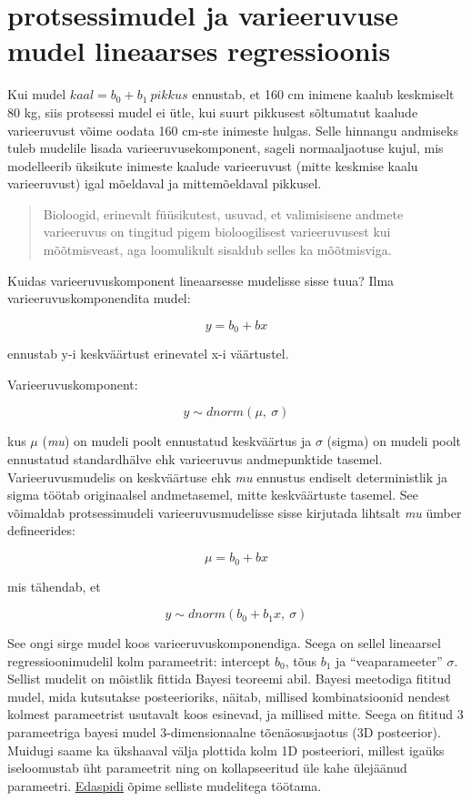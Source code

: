 \documentclass[]{book}
\begin{document}
\hypertarget{protsessimudel-ja-varieeruvuse-mudel-lineaarses-regressioonis}{%
\section{protsessimudel ja varieeruvuse mudel lineaarses regressioonis}\label{protsessimudel-ja-varieeruvuse-mudel-lineaarses-regressioonis}}

Kui mudel \(kaal = b_0 + b_1 ~pikkus\) ennustab, et 160 cm inimene kaalub keskmiselt 80 kg, siis protsessi mudel ei ütle, kui suurt pikkusest sõltumatut kaalude varieeruvust võime oodata 160 cm-ste inimeste hulgas.
Selle hinnangu andmiseks tuleb mudelile lisada varieeruvusekomponent, sageli normaaljaotuse kujul, mis modelleerib üksikute inimeste kaalude varieeruvust (mitte keskmise kaalu varieeruvust) igal mõeldaval ja mittemõeldaval pikkusel.

\begin{quote}
Bioloogid, erinevalt füüsikutest, usuvad, et valimisisene andmete
varieeruvus on tingitud pigem bioloogilisest varieeruvusest kui mõõtmisveast,
aga loomulikult sisaldub selles ka mõõtmisviga.
\end{quote}

Kuidas varieeruvuskomponent lineaarsesse mudelisse sisse tuua?
Ilma varieeruvuskomponendita mudel:

\[y = b_0 + bx\]

ennustab y-i keskväärtust erinevatel x-i väärtustel.

Varieeruvuskomponent:

\[y\sim dnorm(\mu,~\sigma)\]

kus \(\mu\) (\emph{mu}) on mudeli poolt ennustatud keskväärtus ja \(\sigma\) (sigma) on mudeli poolt ennustatud standardhälve ehk varieeruvus andmepunktide tasemel.
Varieeruvusmudelis on keskväärtuse ehk \emph{mu} ennustus endiselt deterministlik ja sigma töötab originaalsel andmetasemel, mitte keskväärtuste tasemel.
See võimaldab protsessimudeli varieeruvusmudelisse sisse kirjutada lihtsalt \emph{mu} ümber defineerides:

\[\mu = b_0 + bx\]

mis tähendab, et

\[y \sim dnorm(b_0 + b_1x, ~\sigma)\]

See ongi sirge mudel koos varieeruvuskomponendiga. Seega on sellel lineaarsel regressioonimudelil kolm parameetrit: intercept \(b_0\), tõus \(b_1\) ja ``veaparameeter'' \(\sigma\).
Sellist mudelit on mõistlik fittida Bayesi teoreemi abil.
Bayesi meetodiga fititud mudel, mida kutsutakse posteerioriks, näitab, millised kombinatsioonid nendest kolmest parameetrist usutavalt koos esinevad, ja millised mitte.
Seega on fititud 3 parameetriga bayesi mudel 3-dimensionaalne tõenäosusjaotus (3D posteerior).
Muidugi saame ka ükshaaval välja plottida kolm 1D posteeriori, millest igaüks iseloomustab üht parameetrit ning on kollapseeritud üle kahe ülejäänud parameetri.
\href{pidev}{Edaspidi} õpime selliste mudelitega töötama.
\end{document}
